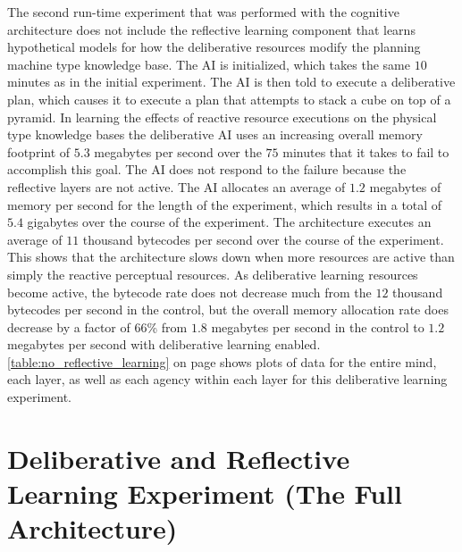 The second run-time experiment that was performed with the cognitive
architecture does not include the reflective learning component that
learns hypothetical models for how the deliberative resources modify
the planning machine type knowledge base.  The AI is initialized,
which takes the same $10$ minutes as in the initial experiment.  The
AI is then told to execute a deliberative plan, which causes it to
execute a plan that attempts to stack a cube on top of a pyramid.  In
learning the effects of reactive resource executions on the physical
type knowledge bases the deliberative AI uses an increasing overall
memory footprint of $5.3$ megabytes per second over the $75$ minutes
that it takes to fail to accomplish this goal.  The AI does not
respond to the failure because the reflective layers are not active.
The AI allocates an average of $1.2$ megabytes of memory per second
for the length of the experiment, which results in a total of $5.4$
gigabytes over the course of the experiment.  The architecture
executes an average of $11$ thousand bytecodes per second over the
course of the experiment.  This shows that the architecture slows down
when more resources are active than simply the reactive perceptual
resources.  As deliberative learning resources become active, the
bytecode rate does not decrease much from the $12$ thousand bytecodes
per second in the control, but the overall memory allocation rate does
decrease by a factor of $66$\% from $1.8$ megabytes per second in the
control to $1.2$ megabytes per second with deliberative learning
enabled.  \autoref{table:no_reflective_learning} on page
\pageref{table:no_reflective_learning} shows plots of data for the
entire mind, each layer, as well as each agency within each layer for
this deliberative learning experiment.

\section{Deliberative and Reflective Learning Experiment (The Full Architecture)}

